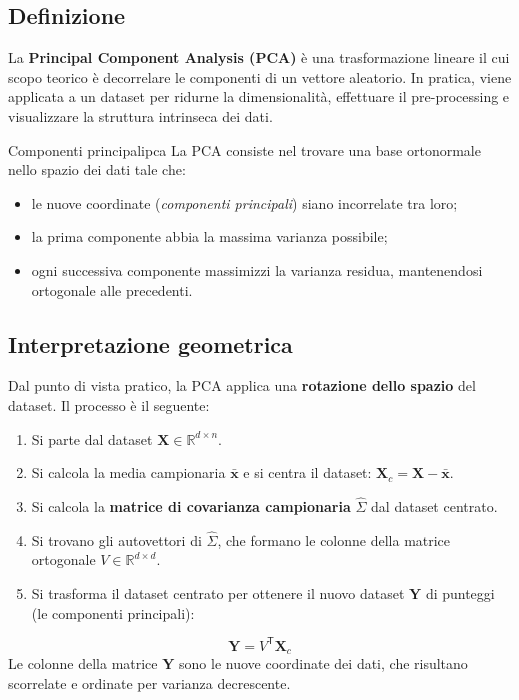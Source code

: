 \subsection{Definizione}

La \textbf{Principal Component Analysis (PCA)} è una trasformazione lineare il
cui scopo teorico è decorrelare le componenti di un vettore aleatorio. In
pratica, viene applicata a un dataset per ridurne la dimensionalità, effettuare
il pre-processing e visualizzare la struttura intrinseca dei dati.

\begin{definizione}{Componenti principali}{pca}
La PCA consiste nel trovare una base ortonormale nello spazio dei dati tale che:
\begin{itemize}
  \item le nuove coordinate (\emph{componenti principali}) siano incorrelate tra
  loro;
  \item la prima componente abbia la massima varianza possibile;
  \item ogni successiva componente massimizzi la varianza residua, mantenendosi
  ortogonale alle precedenti.
\end{itemize}
\end{definizione}

\subsection{Interpretazione geometrica}

Dal punto di vista pratico, la PCA applica una \textbf{rotazione dello spazio}
del dataset. Il processo è il seguente:
\begin{enumerate}
    \item Si parte dal dataset \(\mathbf{X} \in \mathbb{R}^{d \times n}\).
    \item Si calcola la media campionaria \(\bar{\mathbf{x}}\) e si centra il
    dataset: \(\mathbf{X}_c = \mathbf{X} - \bar{\mathbf{x}}\).
    \item Si calcola la \textbf{matrice di covarianza campionaria}
    \(\hat{\Sigma}\) dal dataset centrato.
    \item Si trovano gli autovettori di \(\hat{\Sigma}\), che formano le colonne
    della matrice ortogonale \(V \in \mathbb{R}^{d \times d}\).
    \item Si trasforma il dataset centrato per ottenere il nuovo dataset
    \(\mathbf{Y}\) di punteggi (le componenti principali):
\end{enumerate}
\[
\mathbf{Y} = V^\mathsf{T} \mathbf{X}_c
\]
Le colonne della matrice \(\mathbf{Y}\) sono le nuove coordinate dei dati, che
risultano scorrelate e ordinate per varianza decrescente.

